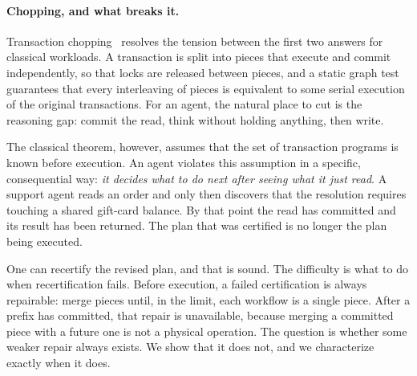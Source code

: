 \paragraph{Chopping, and what breaks it.}
Transaction chopping~\cite{shasha1995chopping} resolves the tension between
the first two answers for classical workloads. A transaction is split into
pieces that execute and commit independently, so that locks are released
between pieces, and a static graph test guarantees that every interleaving of
pieces is equivalent to some serial execution of the original transactions.
For an agent, the natural place to cut is the reasoning gap: commit the read,
think without holding anything, then write.

The classical theorem, however, assumes that the set of transaction programs
is known before execution. An agent violates this assumption in a specific,
consequential way: \emph{it decides what to do next after seeing what it just
read}. A support agent reads an order and only then discovers that the
resolution requires touching a shared gift-card balance. By that point the
read has committed and its result has been returned. The plan that was
certified is no longer the plan being executed.

One can recertify the revised plan, and that is sound. The difficulty is what
to do when recertification fails. Before execution, a failed certification is
always repairable: merge pieces until, in the limit, each workflow is a single
piece. After a prefix has committed, that repair is unavailable, because
merging a committed piece with a future one is not a physical operation. The
question is whether some weaker repair always exists. We show that it does
not, and we characterize exactly when it does.


